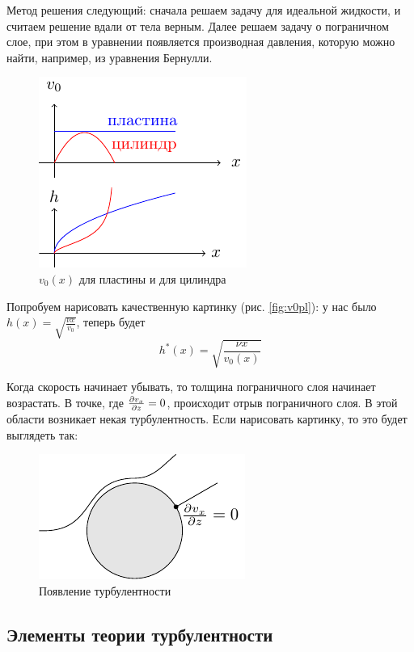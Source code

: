 Метод решения следующий: сначала решаем задачу для идеальной жидкости, и считаем решение вдали от тела верным. Далее решаем задачу о пограничном слое, при этом в уравнении появляется производная давления,
которую можно найти, например, из уравнения Бернулли.

\begin{figure}[h]
    \centering
    \includegraphics[scale=1.5]{img/v0pl}
    \caption{$v_0(x)$ для пластины и для цилиндра}
    \label{fig:v0pl}
\end{figure}
Попробуем нарисовать качественную картинку (рис. \eqref{fig:v0pl}): у нас было $h(x)=\sqrt{\frac{\nu x}{v_0}}$, теперь будет 
\begin{equation}
    h^*(x) = \sqrt{\frac{\nu x}{v_0 (x)}}
\end{equation}

Когда скорость начинает убывать, то толщина пограничного слоя начинает 
возрастать. В точке, где $\pdv{v_x}{z}=0$, происходит отрыв пограничного
 слоя. В этой области возникает некая турбулентность. Если нарисовать картинку, то это будет выглядеть так:
\begin{figure}[H]
    \centering
    \includegraphics[scale=1.5]{img/turb}
    \caption{Появление турбулентности}
    \label{fig:figure1}
\end{figure}

\newpage
{}
\subsection{Элементы теории турбулентности}
